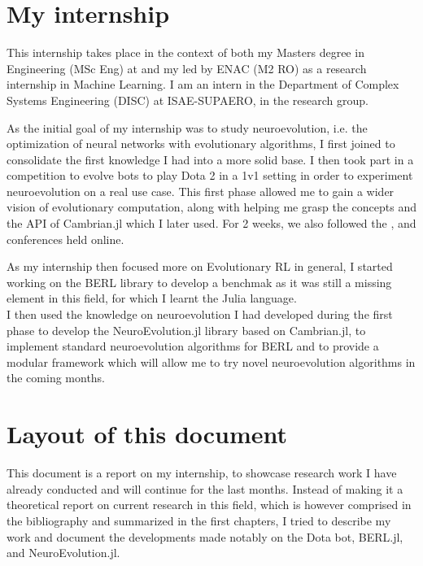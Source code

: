 \section*{My internship}

This internship takes place in the context of both my Masters degree in Engineering (MSc Eng) at  and my  led by ENAC (M2 RO) as a research internship in Machine Learning. I am an intern in the Department of Complex Systems Engineering (DISC) at ISAE-SUPAERO, in the  research group.

As the initial goal of my internship was to study neuroevolution, i.e. the optimization of neural networks with evolutionary algorithms, I first joined  to consolidate the first knowledge I had into a more solid base. I then took part in a competition to evolve bots to play Dota 2 in a 1v1 setting in order to experiment neuroevolution on a real use case. This first phase allowed me to gain a wider vision of evolutionary computation, along with helping me grasp the concepts and the API of Cambrian.jl which I later used. For 2 weeks, we also followed the ,  and  conferences held online. 

As my internship then focused more on Evolutionary RL in general, I started working on the BERL library to develop a benchmak as it was still a missing element in this field, for which I learnt the Julia language. \\
I then used the knowledge on neuroevolution I had developed during the first phase to develop the NeuroEvolution.jl library based on Cambrian.jl, to implement standard neuroevolution algorithms for BERL and to provide a modular framework which will allow me to try novel neuroevolution algorithms in the coming months.

\section*{Layout of this document}

This document is a report on my internship, to showcase research work I have already conducted and will continue for the last months. Instead of making it a theoretical report on current research in this field, which is however comprised in the bibliography and summarized in the first chapters, I tried to describe my work and document the developments made notably on the Dota bot, BERL.jl, and NeuroEvolution.jl.

